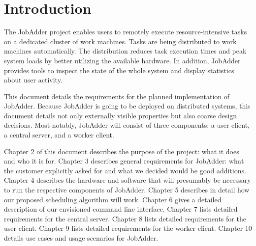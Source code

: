 \chapter{Introduction}
The JobAdder project enables users to remotely execute resource-intensive tasks on a dedicated cluster of work machines.
Tasks are being distributed to work machines automatically.
The distribution reduces task execution times and peak system loads by better utilizing the available hardware.
In addition, JobAdder provides tools to inspect the state of the whole system and display statistics about user activity.

This document details the requirements for the planned implementation of JobAdder.
Because JobAdder is going to be deployed on distributed systems, this document details not only externally visible properties but also coarse design decisions.
Most notably, JobAdder will consist of three components: a user client, a central server, and a worker client.

Chapter 2 of this document describes the purpose of the project: what it does and who it is for.
Chapter 3 describes general requirements for JobAdder: what the customer explicitly asked for and what we decided would be good additions.
Chapter 4 describes the hardware and software that will presumably be necessary to run the respective components of JobAdder.
Chapter 5 describes in detail how our proposed scheduling algorithm will work.
Chapter 6 gives a detailed description of our envisioned command line interface.
Chapter 7 lists detailed requirements for the central server.
Chapter 8 lists detailed requirements for the user client.
Chapter 9 lists detailed requirements for the worker client.
Chapter 10 details use cases and usage scenarios for JobAdder.